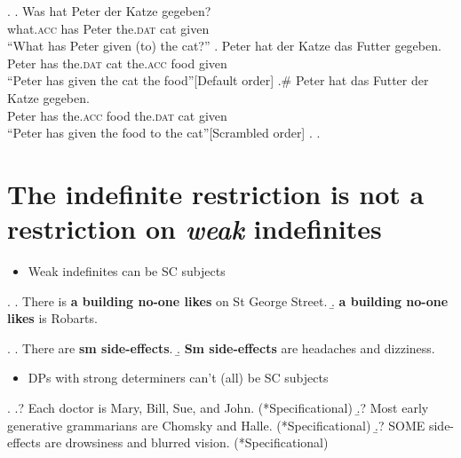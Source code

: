 \documentclass[GPFinal]{subfiles}
\begin{document}
    \z.
  \bg. Was hat Peter der Katze gegeben?\\
what.\textsc{acc} has Peter the.\textsc{dat} cat given\\
``What has Peter given (to) the cat?''
    \ag. Peter hat der Katze das Futter gegeben.\\
Peter has the.\textsc{dat} cat the.\textsc{acc} food given\\
``Peter has given the cat the food''\hfill[Default order]
    \bg.\# Peter hat das Futter der Katze gegeben.\\
Peter has the.\textsc{acc} food the.\textsc{dat} cat given\\
``Peter has given the food to the cat''\hfill[Scrambled order]
    \z.
  \z.

\section{The indefinite restriction is not a restriction on \textit{weak} indefinites}
\begin{itemize}
	\item Weak indefinites can be SC subjects
\end{itemize}
\ex. 
\a. There is \textbf{a building no-one likes} on St George Street.
\b. \textbf{a building no-one likes} is Robarts.

\ex.
\a. There are \textbf{sm side-effects}.
\b. \textbf{Sm side-effects} are headaches and dizziness. 

\begin{itemize}
	\item DPs with strong determiners can't (all) be SC subjects 
\end{itemize}
\ex.
\a.? Each doctor is Mary, Bill, Sue, and John. (*Specificational)
\b.? Most early generative grammarians are Chomsky and Halle. (*Specificational)
\b.? SOME side-effects are drowsiness and blurred vision. (*Specificational)
\end{document}
